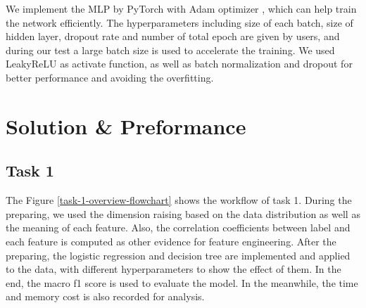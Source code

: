 \documentclass[11pt]{article}
\begin{document}
We implement the MLP by PyTorch with Adam optimizer \cite{kingma2014adam} , which can help train the network efficiently. The hyperparameters including size of each batch, size of hidden layer, dropout rate and number of total epoch are given by users, and during our test a large batch size is used to accelerate the training. We used LeakyReLU as activate function, as well as batch normalization and dropout for better performance and avoiding the overfitting.

\section{Solution \& Preformance}

\subsection{Task 1}

The Figure \ref{task-1-overview-flowchart} shows the workflow of task 1. During the preparing, we used the dimension raising based on the data distribution as well as the meaning of each feature. Also, the correlation coefficients between label and each feature is computed as other evidence for feature engineering. After the preparing, the logistic regression and decision tree are implemented and applied to the data, with different hyperparameters to show the effect of them. In the end, the macro f1 score is used to evaluate the model. In the meanwhile, the time and memory cost is also recorded for analysis.
\end{document}
